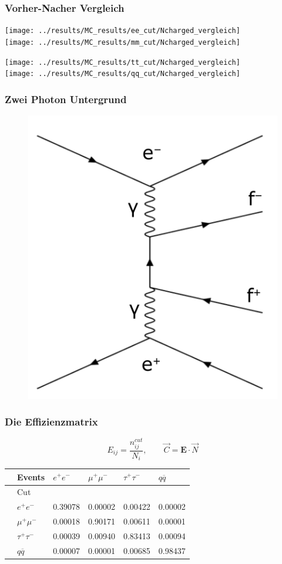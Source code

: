 \begin{frame}
	\frametitle{Vorher-Nacher Vergleich}
	\begin{minipage}{0.48\linewidth}
			\texttt{[image: ../results/MC\_results/ee\_cut/Ncharged\_vergleich]}\\
			\texttt{[image: ../results/MC\_results/mm\_cut/Ncharged\_vergleich]}
	\end{minipage}
	\begin{minipage}{0.48\linewidth}
			\texttt{[image: ../results/MC\_results/tt\_cut/Ncharged\_vergleich]}\\
			\texttt{[image: ../results/MC\_results/qq\_cut/Ncharged\_vergleich]}
		\end{minipage}
\end{frame}

\begin{frame}
	\frametitle{Zwei Photon Untergrund}
	\begin{figure}
		\centering
		\includegraphics[width=0.55\linewidth]{graphics/twophotonfeynman}
	\end{figure}
\end{frame}


\begin{frame}
	\frametitle{Die Effizienzmatrix}
	\begin{equation*}
	E_{ij}=\frac{n^{cut}_{ij}}{N_i},\qquad \vec{C}=\boldsymbol{E}\cdot\vec{N}
	\end{equation*}
	\begin{table}[H]\centering
		\begin{tabular}{@{}llllll@{}}
			\toprule
			&Events &$e^+e^-$&$\mu^+\mu^-$&$\tau^+\tau^-$&$q\overline{q}$\\
			\midrule
			&Cut&&&&\\
			&$e^+e^-$&0.39078&0.00002&0.00422&0.00002\\
			&$\mu^+\mu^-$&0.00018&0.90171&0.00611&0.00001\\
			&$\tau^+\tau^-$&0.00039&0.00940&0.83413&0.00094\\
			&$q\overline{q}$&0.00007&0.00001&0.00685&0.98437\\
		\end{tabular}\\
		\noindent{}
	\end{table}
\end{frame}

